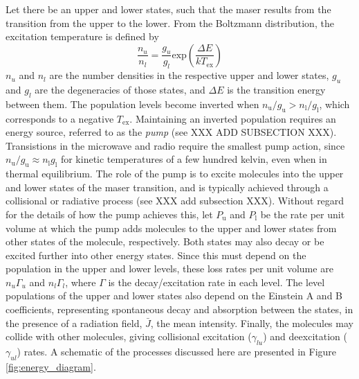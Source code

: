 Let there be an upper and lower states, such that the maser results from the transition from the upper to the lower. From the Boltzmann distribution, the excitation temperature is defined by
\begin{equation}
\label{eq:level_pops}
\frac{n_u}{n_{l}} = \frac{g_{u}}{g_{l}} \mathrm{exp}\left( \frac{\Delta E}{kT_{\mathrm{ex}}} \right)
\end{equation}
$n_u$ and $n_l$ are the number densities in the respective upper and lower states, $g_u$ and $g_l$ are the degeneracies of those states, and $\Delta E$ is the transition energy between them. The population levels become inverted when $n_\mathrm{u}/g_\mathrm{u} \gt n_\mathrm{l}/g_\mathrm{l}$, which corresponds to a negative $T_\mathrm{ex}$. Maintaining an inverted population requires an energy source, referred to as the {\it pump} (see XXX ADD SUBSECTION XXX). Transistions in the microwave and radio require the smallest pump action, since $n_\mathrm{u}/g_\mathrm{u} \approx n_\mathrm{l}g_\mathrm{l}$ for kinetic temperatures of a few hundred kelvin, even when in thermal equilibrium. The role of the pump is to excite molecules into the upper and lower states of the maser transition, and is typically achieved through a collisional or radiative process (see XXX add subsection XXX). Without regard for the details of how the pump achieves this, let $P_\mathrm{u}$ and $P_\mathrm{l}$ be the rate per unit volume at which the pump adds molecules to the upper and lower states from other states of the molecule, respectively. Both states may also decay or be excited further into other energy states. Since this must depend on the population in the upper and lower levels, these loss rates per unit volume are $n_u\Gamma_u$ and $n_l\Gamma_l$, where $\Gamma$ is the decay/excitation rate in each level. The level populations of the upper and lower states also depend on the Einstein A and B coefficients, representing spontaneous decay and absorption between the states, in the presence of a radiation field, $\bar{J}$, the mean intensity. Finally, the molecules may collide with other molecules, giving collisional excitation ($\gamma_{lu}$) and deexcitation ($\gamma_{ul}$) rates. A schematic of the processes discussed here are presented in Figure \ref{fig:energy_diagram}.

